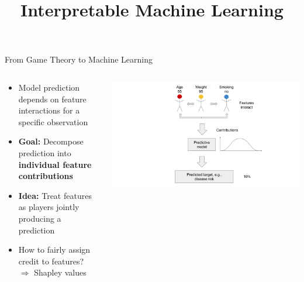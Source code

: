 \documentclass[11pt,compress,t,notes=noshow, aspectratio=169, xcolor=table]{beamer}
\title{Interpretable Machine Learning}
\date{}
\begin{document}
\newcommand{\titlefigure}{figure_man/bike-sharing03.png}
\newcommand{\learninggoals}{
\item See model predictions as a cooperative game
\item Transfer the Shapley value concept from game theory to machine learning
}






\begin{frame}{From Game Theory to Machine Learning}

\begin{columns}[T,onlytextwidth]
\begin{column}{0.55\textwidth}
\begin{itemize}
    \item Model prediction depends on feature interactions for a specific observation
  \item \textbf{Goal:} Decompose prediction into \textbf{individual feature contributions}
  \item \textbf{Idea:} Treat features as players jointly producing a prediction
  \item How to fairly assign credit to features?\\
  $\Rightarrow$ Shapley values %
\end{itemize}
\end{column}

\begin{column}{0.45\textwidth}
  \includegraphics[width=\linewidth, trim=300px 0px 200px 0px, clip]{figure/Shapley_6.png}
\end{column}
\end{columns}

\end{frame}
\end{document}
